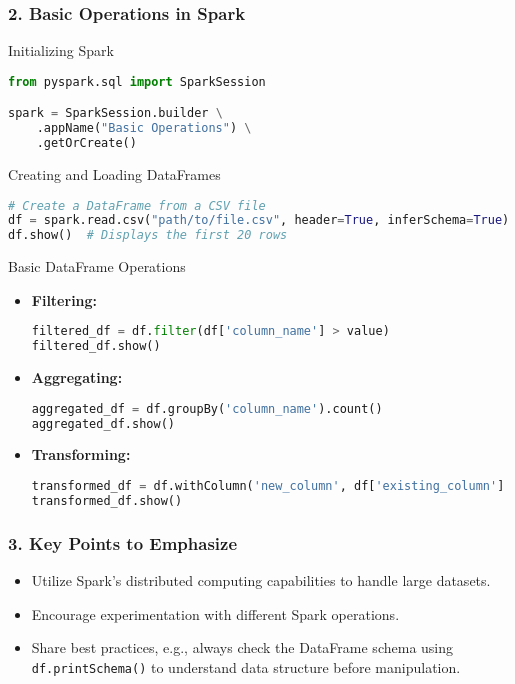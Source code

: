 \documentclass{beamer}
\begin{document}
\begin{frame}[fragile]
    \frametitle{2. Basic Operations in Spark}
    \begin{block}{Initializing Spark}
        \begin{lstlisting}[language=Python]
from pyspark.sql import SparkSession

spark = SparkSession.builder \
    .appName("Basic Operations") \
    .getOrCreate()
        \end{lstlisting}
    \end{block}
    
    \begin{block}{Creating and Loading DataFrames}
        \begin{lstlisting}[language=Python]
# Create a DataFrame from a CSV file
df = spark.read.csv("path/to/file.csv", header=True, inferSchema=True)
df.show()  # Displays the first 20 rows
        \end{lstlisting}
    \end{block}
    
    \begin{block}{Basic DataFrame Operations}
        \begin{itemize}
            \item \textbf{Filtering:}
            \begin{lstlisting}[language=Python]
filtered_df = df.filter(df['column_name'] > value)
filtered_df.show()
            \end{lstlisting}

            \item \textbf{Aggregating:}
            \begin{lstlisting}[language=Python]
aggregated_df = df.groupBy('column_name').count()
aggregated_df.show()
            \end{lstlisting}
            
            \item \textbf{Transforming:}
            \begin{lstlisting}[language=Python]
transformed_df = df.withColumn('new_column', df['existing_column'] * 2)
transformed_df.show()
            \end{lstlisting}
        \end{itemize}
    \end{block}
\end{frame}

\begin{frame}
    \frametitle{3. Key Points to Emphasize}
    \begin{itemize}
        \item Utilize Spark's distributed computing capabilities to handle large datasets.
        \item Encourage experimentation with different Spark operations.
        \item Share best practices, e.g., always check the DataFrame schema using \texttt{df.printSchema()} to understand data structure before manipulation.
    \end{itemize}
\end{frame}
\end{document}
